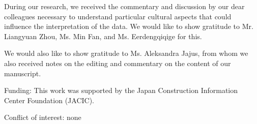\documentclass[smallextended,natbib]{svjour3}       %
\begin{document}
\begin{acknowledgements}

During our research, we received the commentary and discussion by our dear colleagues necessary to understand particular cultural aspects that could influence the interpretation of the data. We would like to show gratitude to Mr. Liangyuan Zhou, Ms. Min Fan, and Ms. Eerdengqiqige for this.

We would also like to show gratitude to Ms. Aleksandra Jajus, from whom we also received notes on the editing and commentary on the content of our manuscript.

\medskip

Funding: This work was supported by the Japan Construction Information Center Foundation (JACIC).

\medskip

Conflict of interest: none

\end{acknowledgements}



\end{document}
